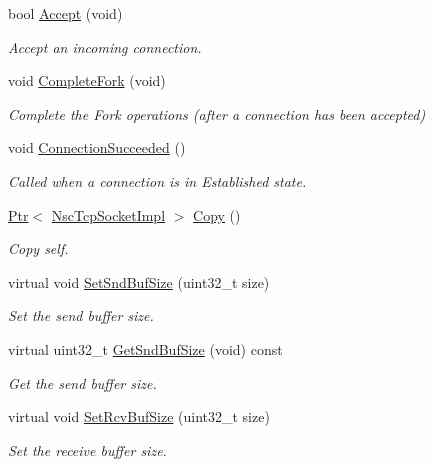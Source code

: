 \begin{DoxyCompactItemize}
bool \hyperlink{classns3_1_1NscTcpSocketImpl_a95aacc7321726467d1b0daaf6bbdd986}{Accept} (void)
\begin{DoxyCompactList}\small\item\em Accept an incoming connection. \end{DoxyCompactList}\item 
void \hyperlink{classns3_1_1NscTcpSocketImpl_a97c12e4b7625d21acce2bee3abfd87c4}{Complete\+Fork} (void)
\begin{DoxyCompactList}\small\item\em Complete the Fork operations (after a connection has been accepted) \end{DoxyCompactList}\item 
void \hyperlink{classns3_1_1NscTcpSocketImpl_afaf5ba2a200f60f9cc8a31468ad04084}{Connection\+Succeeded} ()
\begin{DoxyCompactList}\small\item\em Called when a connection is in Established state. \end{DoxyCompactList}\item 
\hyperlink{classns3_1_1Ptr}{Ptr}$<$ \hyperlink{classns3_1_1NscTcpSocketImpl}{Nsc\+Tcp\+Socket\+Impl} $>$ \hyperlink{classns3_1_1NscTcpSocketImpl_a4a6a5f3eef17264ef8529a46a8be72aa}{Copy} ()
\begin{DoxyCompactList}\small\item\em Copy self. \end{DoxyCompactList}\item 
virtual void \hyperlink{classns3_1_1NscTcpSocketImpl_adcecc93e716ef3132002d1402a4dbbc1}{Set\+Snd\+Buf\+Size} (uint32\+\_\+t size)
\begin{DoxyCompactList}\small\item\em Set the send buffer size. \end{DoxyCompactList}\item 
virtual uint32\+\_\+t \hyperlink{classns3_1_1NscTcpSocketImpl_aca61e2aecc505190de3f29d537d9b71a}{Get\+Snd\+Buf\+Size} (void) const 
\begin{DoxyCompactList}\small\item\em Get the send buffer size. \end{DoxyCompactList}\item 
virtual void \hyperlink{classns3_1_1NscTcpSocketImpl_a599c71fb65a0b3fd00b247e24f085c49}{Set\+Rcv\+Buf\+Size} (uint32\+\_\+t size)
\begin{DoxyCompactList}\small\item\em Set the receive buffer size. \end{DoxyCompactList}\item 

\end{DoxyCompactItemize}
